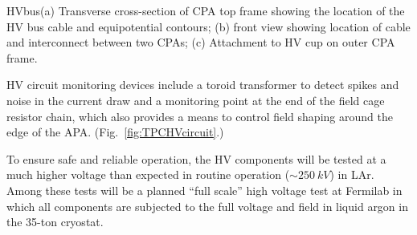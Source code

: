 \begin{cdrfigure}{HVbus}{(a) Transverse cross-section of CPA top frame showing the location of the HV bus cable and equipotential contours; (b) front view showing location of cable and interconnect between two CPAs; (c) Attachment to HV cup on outer CPA frame.}
\end{cdrfigure}

HV circuit monitoring devices include a toroid transformer to detect
spikes and noise in the current draw and a monitoring point at the end
of the field cage resistor chain, which also provides a means to
control field shaping around the edge of the
APA. (Fig.\ \ref{fig:TPCHVcircuit}.)

To ensure safe and reliable operation, the HV components will be
tested at a much higher voltage than expected in routine operation
($\sim\SI{250}{kV}$) in LAr. Among these tests will be a planned
``full scale'' high voltage test at Fermilab in which all components
are subjected to the full voltage and field in liquid argon in the
35-ton cryostat.


